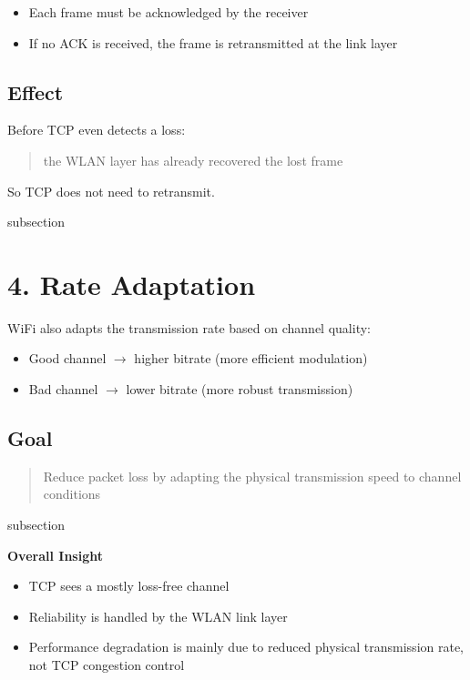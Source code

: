 \begin{itemize}
    \item Each frame must be acknowledged by the receiver
    \item If no ACK is received, the frame is retransmitted at the link layer
\end{itemize}

\subsection*{Effect}

Before TCP even detects a loss:

\begin{quote}
the WLAN layer has already recovered the lost frame
\end{quote}

So TCP does not need to retransmit.

subsection

\section{4. Rate Adaptation}

WiFi also adapts the transmission rate based on channel quality:

\begin{itemize}
    \item Good channel $\rightarrow$ higher bitrate (more efficient modulation)
    \item Bad channel $\rightarrow$ lower bitrate (more robust transmission)
\end{itemize}

\subsection*{Goal}

\begin{quote}
Reduce packet loss by adapting the physical transmission speed to channel conditions
\end{quote}

subsection

\begin{notebox}
    \textbf{Overall Insight}
\begin{itemize}
    \item TCP sees a mostly loss-free channel
    \item Reliability is handled by the WLAN link layer
    \item Performance degradation is mainly due to reduced physical transmission rate, not TCP congestion control
\end{itemize}
\end{notebox}

